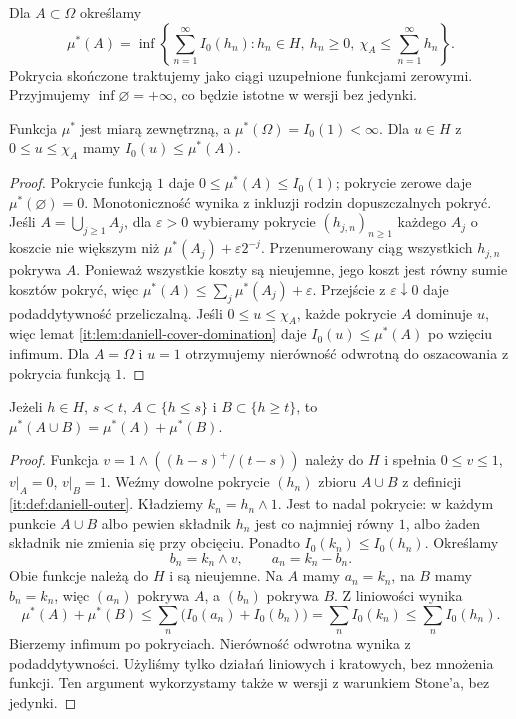 \begin{definicja}\label{it:def:daniell-outer}
Dla $A\subset\Omega$ określamy
\begin{equation}\label{it:eq:daniell-outer}
 \mu^*(A)=\inf\left\{\sum_{n=1}^\infty I_0(h_n):
 h_n\in H,\ h_n\ge0,\ \chi_A\le\sum_{n=1}^\infty h_n\right\}.
\end{equation}
Pokrycia skończone traktujemy jako ciągi uzupełnione funkcjami zerowymi. Przyjmujemy $\inf\varnothing=+\infty$, co będzie istotne w wersji bez jedynki.
\end{definicja}
\begin{lemat}\label{it:lem:daniell-outer}
Funkcja $\mu^*$ jest miarą zewnętrzną, a $\mu^*(\Omega)=I_0(1)<\infty$. Dla $u\in H$ z $0\le u\le\chi_A$ mamy $I_0(u)\le\mu^*(A)$.
\end{lemat}
\begin{proof}
Pokrycie funkcją $1$ daje $0\le\mu^*(A)\le I_0(1)$; pokrycie zerowe daje $\mu^*(\varnothing)=0$. Monotoniczność wynika z inkluzji rodzin dopuszczalnych pokryć. Jeśli $A=\bigcup_{j\ge1}A_j$, dla $\varepsilon>0$ wybieramy pokrycie $(h_{j,n})_{n\ge1}$ każdego $A_j$ o koszcie nie większym niż $\mu^*(A_j)+\varepsilon 2^{-j}$. Przenumerowany ciąg wszystkich $h_{j,n}$ pokrywa $A$. Ponieważ wszystkie koszty są nieujemne, jego koszt jest równy sumie kosztów pokryć, więc
$\mu^*(A)\le\sum_j\mu^*(A_j)+\varepsilon$. Przejście z $\varepsilon\downarrow0$ daje podaddytywność przeliczalną. Jeśli $0\le u\le\chi_A$, każde pokrycie $A$ dominuje $u$, więc lemat \ref{it:lem:daniell-cover-domination} daje $I_0(u)\le\mu^*(A)$ po wzięciu infimum. Dla $A=\Omega$ i $u=1$ otrzymujemy nierówność odwrotną do oszacowania z pokrycia funkcją $1$.
\end{proof}

\begin{lemat}\label{it:lem:daniell-separated}
Jeżeli $h\in H$, $s<t$, $A\subset\{h\le s\}$ i $B\subset\{h\ge t\}$, to $\mu^*(A\cup B)=\mu^*(A)+\mu^*(B)$.
\end{lemat}
\begin{proof}
Funkcja $v=1\wedge((h-s)^+/(t-s))$ należy do $H$
i spełnia $0\le v\le1$, $v|_A=0$, $v|_B=1$.
Weźmy dowolne pokrycie $(h_n)$ zbioru $A\cup B$
z definicji \ref{it:def:daniell-outer}.
Kładziemy $k_n=h_n\wedge1$. Jest to nadal pokrycie:
w każdym punkcie $A\cup B$ albo pewien składnik $h_n$
jest co najmniej równy $1$, albo żaden składnik
nie zmienia się przy obcięciu. Ponadto
$I_0(k_n)\le I_0(h_n)$.
Określamy
\[
 b_n=k_n\wedge v,\qquad a_n=k_n-b_n.
\]
Obie funkcje należą do $H$ i są nieujemne.
Na $A$ mamy $a_n=k_n$, na $B$ mamy $b_n=k_n$,
więc $(a_n)$ pokrywa $A$, a $(b_n)$ pokrywa $B$.
Z liniowości wynika
\[
 \mu^*(A)+\mu^*(B)\le
 \sum_n\bigl(I_0(a_n)+I_0(b_n)\bigr)
 =\sum_n I_0(k_n)\le\sum_n I_0(h_n).
\]
Bierzemy infimum po pokryciach. Nierówność odwrotna
wynika z podaddytywności.
Użyliśmy tylko działań liniowych i kratowych,
bez mnożenia funkcji. Ten argument wykorzystamy
także w wersji z warunkiem Stone'a, bez jedynki.
\end{proof}

